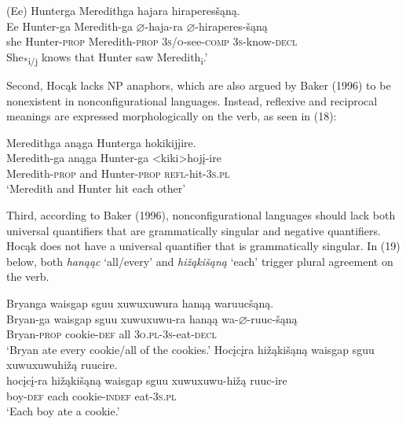 \documentclass[output=paper]{LSP/langsci}
\begin{document}
\begin{exe}
\ex	
\glll (Ee) 	Hunterga 	Meredithga		hajara 						hiraperes\v{s}\k{a}n\k{a}. \\
 Ee 		Hunter-ga 	Meredith-ga 		$\varnothing$-haja-ra 				$\varnothing$-hiraperes-\v{s}\k{a}n\k{a} \\
she 		Hunter-\textsc{prop} 	Meredith-\textsc{prop} 	\textsc{3s/o}-see-\textsc{comp} 	\textsc{3s}-know-\textsc{decl}  \\
\trans She\textsubscript{*i/j} knows that Hunter saw Meredith\textsubscript{i}.'
\end{exe}	

Second, Hoc\k{a}k lacks NP anaphors, which are also argued by Baker (1996) to be nonexistent in nonconfigurational languages. Instead, reflexive and reciprocal meanings are expressed morphologically on the verb, as seen in (18):

\begin{exe}
\ex 
\glll Meredithga		an\k{a}ga 	Hunterga 			hokikij\k{i}ire.\\
Meredith-ga	 	an\k{a}ga 	Hunter-ga 			<kiki>hoj\k{i}-ire \\
Meredith-\textsc{prop} and 		Hunter-\textsc{prop} 	\textsc{refl}-hit-\textsc{3s.pl} \\
\trans `Meredith and Hunter hit each other'
\end{exe}
	
Third, according to Baker (1996), nonconfigurational languages should lack both universal quantifiers that are grammatically singular and negative quantifiers. Hoc\k{a}k does not have a universal quantifier that is grammatically singular.  In (19) below, both \textit{han\k{a}\k{a}c} `all/every' and \textit{hi\v{z}\k{a}ki\v{s}\k{a}n\k{a}} `each' trigger plural agreement on the verb.

\begin{exe}
\ex	
\begin{xlist}
\ex	
\glll Bryanga {waisgap sguu xuwuxuwura} 	han\k{a}\k{a} 	waruuc\v{s}\k{a}n\k{a}.\\
Bryan-ga 	{waisgap sguu xuwuxuwu-ra} 	han\k{a}\k{a} 	wa-$\varnothing$-ruuc-\v{s}\k{a}n\k{a} \\
	Bryan-\textsc{prop} 	cookie-\textsc{def}	all 		\textsc{3o.pl-3s}-eat-\textsc{decl} \\
\trans `Bryan ate every cookie/all of the cookies.'
\ex 
\glll Hoc\k{i}c\k{i}ra 	hi\v{z}\k{a}ki\v{s}\k{a}n\k{a} 	{waisgap sguu xuwuxuwuhi\v{z}\k{a} }		ruucire.\\
hoc\k{i}c\k{i}-ra 	hi\v{z}\k{a}ki\v{s}\k{a}n\k{a} 	{waisgap sguu xuwuxuwu-hi\v{z}\k{a} }		ruuc-ire \\
	boy-\textsc{def} 		each 					cookie-\textsc{indef}		eat-\textsc{3s.pl}\\
\trans `Each boy ate a cookie.'
\end{xlist}
\end{exe}
\end{document}
